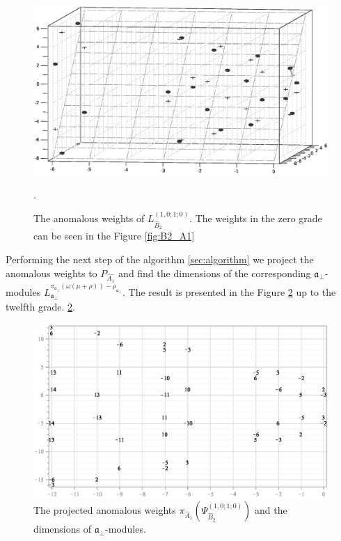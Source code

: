 \documentclass[12pt]{iopart}
\begin{document}
\begin{figure}[h!tb]
  \includegraphics[width=140mm]{figure11.eps}
  \caption{The anomalous weights of $L^{(1,0;1;0)}_{\hat B_2 }$.
  The weights in the zero grade can be seen in the Figure \ref{fig:B2_A1}}.
  \label{fig:affine_B2_anom_point}
\end{figure}

Performing the next step of the algorithm \ref{sec:algorithm} we project the anomalous weights to
$P_{\hat{A_1}}$ and find the dimensions of the corresponding
$\mathfrak{a}_{\bot}$-modules $L^{\pi_{\mathfrak{a}_{\bot}}(\omega(\mu+\rho))-\rho_{\mathfrak{a}_{\bot}}}_{\mathfrak{a}_{\bot}}$.
The result is presented in the Figure
\ref{fig:AffineB2_A1_anom_proj} up to the twelfth grade.
\ref{fig:AffineB2_A1_anom_proj}.
\begin{figure}[h!tb]
  \centering
  \includegraphics[width=120mm]{figure12.eps}
  \caption{The projected anomalous weights $\pi_{\hat A_1}\left(\Psi^{(1,0;1;0)}_{\hat B_2}\right)$ and the dimensions of $\mathfrak{a}_{\bot}$-modules.}
  \label{fig:AffineB2_A1_anom_proj}
\end{figure}
\end{document}
